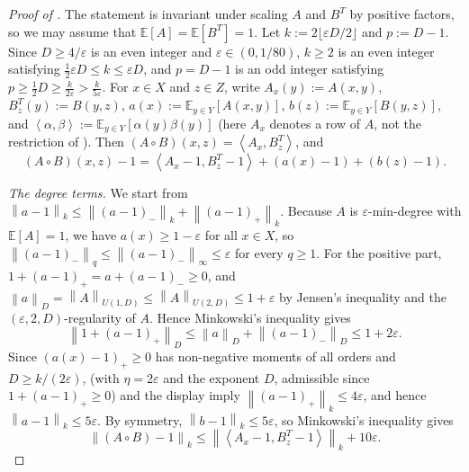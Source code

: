 \documentclass[11pt]{article}
\theoremstyle{definition}
\renewcommand{\label}[1]{}%
\newcommand{\E}{\mathbb{E}}
\newcommand{\norm}[1]{\left\lVert #1 \right\rVert}
\newcommand{\ip}[2]{\left\langle #1, #2 \right\rangle}
\newcommand{\dens}[1]{\E[#1]}
\begin{document}
\begin{proof}[Proof of ]
The statement is invariant under scaling $A$ and $B^T$ by positive factors, so we may assume that $\dens{A} = \dens{B^T} = 1$. Let $k := 2\lfloor \varepsilon D / 2 \rfloor$ and $p := D - 1$. Since $D \ge 4/\varepsilon$ is an even integer and $\varepsilon \in (0, 1/80)$, $k \ge 2$ is an even integer satisfying $\frac{1}{2}\varepsilon D \le k \le \varepsilon D$, and $p = D - 1$ is an odd integer satisfying $p \ge \frac{1}{2}D \ge \frac{k}{2\varepsilon} > \frac{k}{5\varepsilon}$. For $x \in X$ and $z \in Z$, write $A_x(y) := A(x, y)$, $B^T_z(y) := B(y, z)$, $a(x) := \E_{y \in Y}[A(x, y)]$, $b(z) := \E_{y \in Y}[B(y, z)]$, and $\ip{\alpha}{\beta} := \E_{y \in Y}[\alpha(y)\beta(y)]$ (here $A_x$ denotes a row of $A$, not the restriction of ). Then $(A \circ B)(x, z) = \ip{A_x}{B^T_z}$, and
\[
    (A \circ B)(x, z) - 1 = \ip{A_x - 1}{B^T_z - 1} + (a(x) - 1) + (b(z) - 1).
\]

\emph{The degree terms.} We start from $\norm{a - 1}_k \le \norm{(a - 1)_-}_k + \norm{(a - 1)_+}_k$. Because $A$ is $\varepsilon$-min-degree with $\dens{A} = 1$, we have $a(x) \ge 1 - \varepsilon$ for all $x \in X$, so $\norm{(a - 1)_-}_q \le \norm{(a - 1)_-}_\infty \le \varepsilon$ for every $q \ge 1$. For the positive part, $1 + (a - 1)_+ = a + (a - 1)_- \ge 0$, and $\norm{a}_D = \norm{A}_{U(1, D)} \le \norm{A}_{U(2, D)} \le 1 + \varepsilon$ by Jensen's inequality and the $(\varepsilon, 2, D)$-regularity of $A$. Hence Minkowski's inequality gives
\[
    \norm{1 + (a - 1)_+}_D \le \norm{a}_D + \norm{(a - 1)_-}_D \le 1 + 2\varepsilon.
\]
Since $(a(x) - 1)_+ \ge 0$ has non-negative moments of all orders and $D \ge k/(2\varepsilon)$,  (with $\eta = 2\varepsilon$ and the exponent $D$, admissible since $1 + (a - 1)_+ \ge 0$) and the display imply $\norm{(a - 1)_+}_k \le 4\varepsilon$, and hence $\norm{a - 1}_k \le 5\varepsilon$. By symmetry, $\norm{b - 1}_k \le 5\varepsilon$, so Minkowski's inequality gives
\begin{equation}\label{eq:klm-triangle}
    \norm{(A \circ B) - 1}_k \le \norm{\ip{A_x - 1}{B^T_z - 1}}_k + 10\varepsilon.
\end{equation}


\end{proof}
\end{document}

